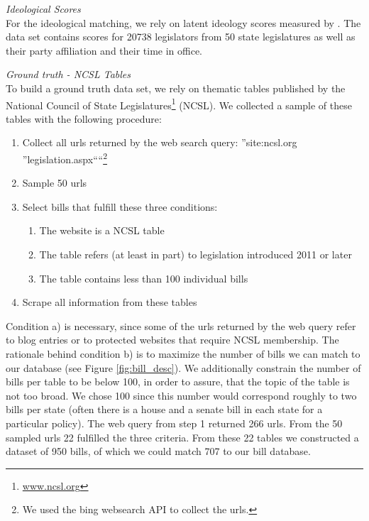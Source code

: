\documentclass[12pt]{article} %
\begin{document}
\textit{Ideological Scores}\\
For the ideological matching, we rely on latent ideology scores measured by \citep{shor2011}. The data set contains scores for 20738 legislators from 50 state legislatures as well as their party affiliation and their time in office. 


\textit{Ground truth - NCSL Tables}\\

To build a ground truth data set, we rely on thematic tables published by the National Council of State Legislatures\footnote{\url{www.ncsl.org}} (NCSL). We collected a sample of these tables with the following procedure:

\begin{singlespacing}

\begin{enumerate}
    \item Collect all urls returned by the web search query: ''site:ncsl.org ''legislation.aspx````\footnote{We used the bing websearch API to collect the urls.}
    \item Sample 50 urls
    \item Select bills that fulfill these three conditions:
        \begin{enumerate}
            \item The website is a NCSL table
            \item The table refers (at least in part) to legislation introduced 2011 or later
            \item The table contains less than 100 individual bills
        \end{enumerate}
    \item Scrape all information from these tables
\end{enumerate}

\end{singlespacing}

Condition a) is necessary, since some of the urls returned by the web query refer to blog entries or to protected websites that require NCSL membership. The rationale behind condition b) is to maximize the number of bills we can match to our database (see Figure \ref{fig:bill_desc}). We additionally constrain the number of bills per table to be below 100, in order to assure, that the topic of the table is not too broad. We chose 100 since this number would correspond roughly to two bills per state (often there is a house and a senate bill in each state for a particular policy).
The web query from step 1 returned 266 urls. From the 50 sampled urls 22 fulfilled the three criteria. From these 22 tables we constructed a dataset of 950 bills, of which we could match 707 to our bill database.
\end{document}
